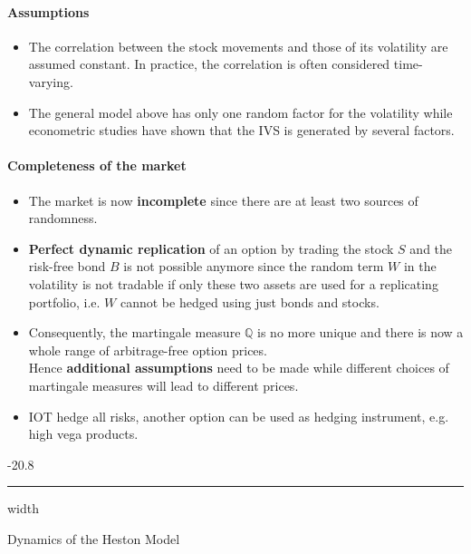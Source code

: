 \documentclass[a4paper,landscape,7pt,fleqn]{scrartcl}
\makeatletter
\renewcommand{\emph}[1]{\textbf{#1}}
\renewcommand{\subsubsection}{\@startsection{subsubsection}{1}{0mm}%
{-2\baselineskip}{0.8\baselineskip}%
{\hrule depth 0.2pt width\columnwidth\vspace*{1.2em}\normalsize\bfseries}}
\makeatother
\begin{document}
\begin{multicols*}{3}
\paragraph{Assumptions}
\begin{itemize}
\item The correlation between the stock movements and those of its volatility are assumed constant. In practice, the correlation is often considered time-varying.
\item The general model above has only one random factor for the volatility while econometric studies have shown that the IVS is generated by several factors.
\end{itemize}

\paragraph{Completeness of the market}
\begin{itemize}
\item The market is now \emph{incomplete} since there are at least two sources of randomness.
\item \emph{Perfect dynamic replication} of an option by trading the stock $S$ and the risk-free bond $B$ is not possible anymore since the random term $W$ in the volatility is not tradable if only these two assets are used for a replicating portfolio, i.e. $W$ cannot be hedged using just bonds and stocks.
\item Consequently, the martingale measure $\mathbb{Q}$ is no more unique and there is now a whole range of arbitrage-free option prices. \\
Hence \emph{additional assumptions} need to be made while different choices of martingale measures will lead to different prices.
\item IOT hedge all risks, another option can be used as hedging instrument, e.g. high vega products.
\end{itemize}

\subsubsection{Dynamics of the Heston Model}


\end{multicols*}
\end{document}
